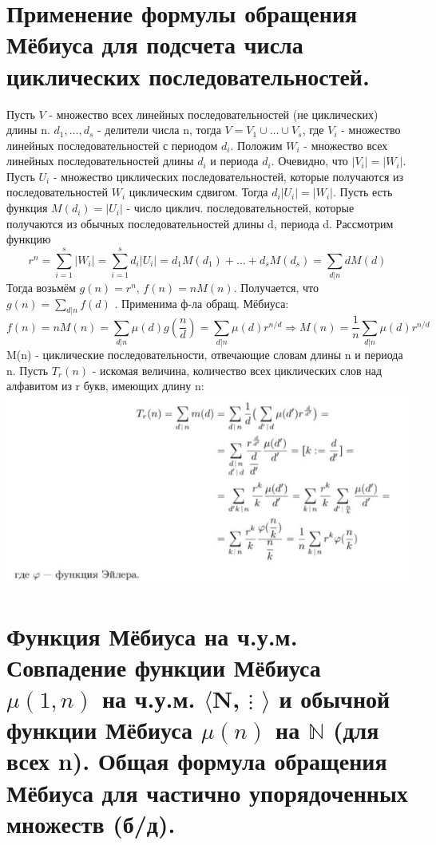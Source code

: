 \setcounter{section}{41}

\section{Применение формулы обращения Мёбиуса для подсчета числа циклических последовательностей.}

Пусть $V$ - множество всех линейных последовательностей (не циклических) длины n. $d_1, \dots, d_s$ - делители числа n, тогда $V = V_1 \cup \dots \cup V_s$, где $V_i$ - множество линейных последовательностей с периодом $d_i$. Положим $W_i$ - множество всех линейных последовательностей длины $d_i$ и периода $d_i$. Очевидно, что $|V_i| = |W_i|$. Пусть $U_i$ - множество циклических последовательностей, которые получаются из последовательностей $W_i$ циклическим сдвигом. Тогда $d_i|U_i| = |W_i|$. Пусть есть функция $M(d_i) = |U_i|$ - число циклич. последовательностей, которые получаются из обычных последовательностей длины d, периода d. Рассмотрим функцию \[r^n =  \sum_{i=1}^s |W_i| = \sum_{i=1}^s d_i|U_i| = d_1M(d_1) + \dots + d_sM(d_s) = \sum_{d|n} dM(d)\]
Тогда возьмём $g(n) = r^n$, $f(n) = nM(n)$. Получается, что $g(n) = \sum_{d|n}f(d)$ . Применима ф-ла обращ. Мёбиуса: \[f(n) = nM(n) = \sum_{d|n} \mu (d)g(\frac{n}{d}) =   \sum_{d|n} \mu (d) r^{n/d} \Rightarrow  M(n) = \frac{1}{n} \sum_{d|n} \mu (d) r^{n/d}\]
M(n) - циклические последовательности, отвечающие словам длины n и периода n. Пусть $T_r(n)$ - искомая величина, количество всех циклических слов над алфавитом из r букв, имеющих длину n: \\
\includegraphics{images/42}

\section{Функция Мёбиуса на ч.у.м. Совпадение функции Мёбиуса $\mu(1, n)$ на ч.у.м. $\langle$N, $\vdots$ $\rangle$ и обычной функции Мёбиуса $\mu(n)$ на $ \mathbb{N}$ (для всех n). Общая формула обращения Мёбиуса для частично упорядоченных множеств (б/д).}

